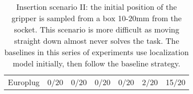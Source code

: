 \begin{table}[]
\begin{tabular}{l|r|r|r|r|r|r}
Europlug      & 0/20                         & 0/20                                                                        & 0/20                                                                        & 0/20                                                                        & 2/20                                                                         & 15/20                                                                
\end{tabular}
\caption{Insertion scenario II: the initial position of the gripper is sampled from a box 10-20mm from the socket. This scenario is more difficult as moving straight down almost never solves the task. The baselines in this series of experiments use localization model initially, then follow the baseline strategy.}
\label{table:hard}
\end{table}

\renewcommand{\arraystretch}{1.4}
\setlength{\arrayrulewidth}{0.1mm}
\setlength{\tabcolsep}{3pt}